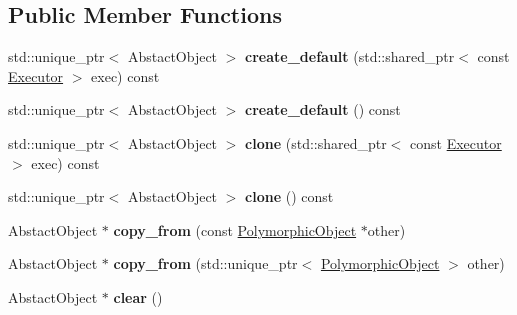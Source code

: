 \subsection*{Public Member Functions}
\begin{DoxyCompactItemize}
\item 
\mbox{\label{classgko_1_1EnableAbstractPolymorphicObject_afe4ec718648d83a9558d3857814c9b9a}} 
std\+::unique\+\_\+ptr$<$ Abstact\+Object $>$ {\bfseries create\+\_\+default} (std\+::shared\+\_\+ptr$<$ const \hyperlink{classgko_1_1Executor}{Executor} $>$ exec) const
\item 
\mbox{\label{classgko_1_1EnableAbstractPolymorphicObject_a26c03af9356362ec0ca4f7b9c4085583}} 
std\+::unique\+\_\+ptr$<$ Abstact\+Object $>$ {\bfseries create\+\_\+default} () const
\item 
\mbox{\label{classgko_1_1EnableAbstractPolymorphicObject_a6183560a0ccc5c8cbc4be2e9ad27c000}} 
std\+::unique\+\_\+ptr$<$ Abstact\+Object $>$ {\bfseries clone} (std\+::shared\+\_\+ptr$<$ const \hyperlink{classgko_1_1Executor}{Executor} $>$ exec) const
\item 
\mbox{\label{classgko_1_1EnableAbstractPolymorphicObject_aff03b057dd81865dbbe09e708b368f36}} 
std\+::unique\+\_\+ptr$<$ Abstact\+Object $>$ {\bfseries clone} () const
\item 
\mbox{\label{classgko_1_1EnableAbstractPolymorphicObject_a85130926792743e8ae61af1b4beb003c}} 
Abstact\+Object $\ast$ {\bfseries copy\+\_\+from} (const \hyperlink{classgko_1_1PolymorphicObject}{Polymorphic\+Object} $\ast$other)
\item 
\mbox{\label{classgko_1_1EnableAbstractPolymorphicObject_a1c021e3710785503593b7054d8c1210d}} 
Abstact\+Object $\ast$ {\bfseries copy\+\_\+from} (std\+::unique\+\_\+ptr$<$ \hyperlink{classgko_1_1PolymorphicObject}{Polymorphic\+Object} $>$ other)
\item 
\mbox{\label{classgko_1_1EnableAbstractPolymorphicObject_a4f42a63eedf0bc751262d4493651146a}} 
Abstact\+Object $\ast$ {\bfseries clear} ()
\end{DoxyCompactItemize}


